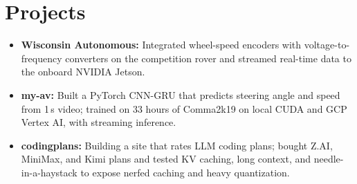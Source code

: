 \documentclass[11pt, letterpaper]{article}
\begin{document}
\section{Projects}
\begin{itemize}
  \item \textbf{Wisconsin Autonomous:} Integrated wheel-speed encoders with voltage-to-frequency converters on the competition rover and streamed real-time data to the onboard NVIDIA Jetson.
  \item \textbf{my-av:} Built a PyTorch CNN-GRU that predicts steering angle and speed from 1\,s video; trained on 33 hours of Comma2k19 on local CUDA and GCP Vertex AI, with streaming inference.
  \item \textbf{codingplans:} Building a site that rates LLM coding plans; bought Z.AI, MiniMax, and Kimi plans and tested KV caching, long context, and needle-in-a-haystack to expose nerfed caching and heavy quantization.
\end{itemize}
\end{document}
